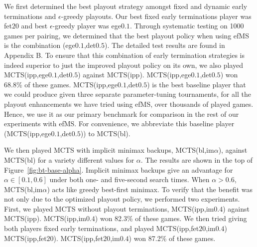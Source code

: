 \documentclass{article}
\begin{document}
We first determined the best playout strategy amongst fixed and dynamic early 
terminations and $\epsilon$-greedy playouts.
Our best fixed early terminations player was fet$20$ and best $\epsilon$-greedy player was ege$0.1$.
Through systematic testing on 1000 games per pairing, we determined that the best playout 
policy when using efMS is the combination (ege$0.1$,det$0.5$). 
The detailed test results are found in Appendix B.
To ensure that this combination of early termination strategies is indeed superior to just the improved 
playout policy on its own, we also played MCTS(ipp,ege$0.1$,det$0.5$) against MCTS(ipp). 
MCTS(ipp,ege$0.1$,det$0.5$) won 68.8\% of these games.
MCTS(ipp,ege$0.1$,det$0.5$) is the best baseline player that we could produce given three separate 
parameter-tuning tournaments, for all the playout enhancements we have tried using efMS, over 
thousands of played games. Hence, we use it as our primary benchmark for comparison in the 
rest of our experiments with efMS. 
For convenience, we abbreviate this baseline player (MCTS(ipp,ege$0.1$,det$0.5$)) to MCTS(bl). 


We then played MCTS with implicit minimax backups, MCTS(bl,im$\alpha$), against MCTS(bl) for a 
variety different values for $\alpha$. The results are shown in the top of Figure~\ref{fig:bt-base-alpha}.
Implicit minimax backups give an advantage for $\alpha \in [0.1,0.6]$ under both one- and five-second 
search times. 
When $\alpha > 0.6$, MCTS(bl,im$\alpha$) acts like greedy best-first minimax.
To verify that the benefit was not only due to the optimized playout policy, we performed two experiments. 
First, we played MCTS without playout terminations, MCTS(ipp,im$0.4$) against MCTS(ipp). 
MCTS(ipp,im$0.4$) won 82.3\% of these games. 
We then tried giving both players fixed early terminations, and played MCTS(ipp,fet$20$,im$0.4$) 
MCTS(ipp,fet$20$). MCTS(ipp,fet$20$,im$0.4$) won 87.2\% of these games.
\end{document}
